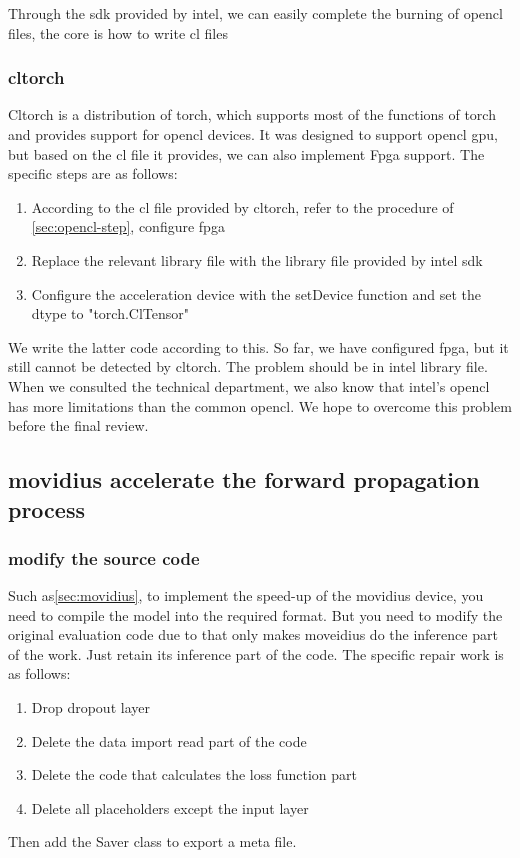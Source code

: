 Through the sdk provided by intel, we can easily complete the burning of opencl files, the core is how to write cl files\subsubsection{cltorch}
Cltorch is a distribution of torch, which supports most of the functions of torch and provides support for opencl devices. It was designed to support opencl gpu, but based on the cl file it provides, we can also implement Fpga support. The specific steps are as follows:
\begin{enumerate}
  \item According to the cl file provided by cltorch, refer to the procedure of \ref{sec:opencl-step}, configure fpga
  \item Replace the relevant library file with the library file provided by intel sdk
  \item Configure the acceleration device with the setDevice function and set the dtype to "torch.ClTensor"
\end{enumerate}
We write the latter code according to this. 
So far, we have configured fpga, but it still cannot be detected by cltorch. The problem should be in intel library file. When we consulted the technical department, we also know that intel's opencl has more limitations than the common opencl. We hope to overcome this problem before the final review.
\subsection{movidius accelerate the forward propagation process}
\subsubsection{modify the source code}

Such as\ref{sec:movidius}, to implement the speed-up of the movidius device, you need to compile the model into the required format.
But you need to modify the original evaluation code due to that only makes moveidius do the inference part of the work. Just retain its inference part of the code. The specific repair work is as follows:
\begin{enumerate}
    \item Drop dropout layer
    \item Delete the data import read part of the code
     \item  Delete the code that calculates the loss function part
     \item  Delete all placeholders except the input layer
\end{enumerate}
Then add the Saver class to export a meta file.

